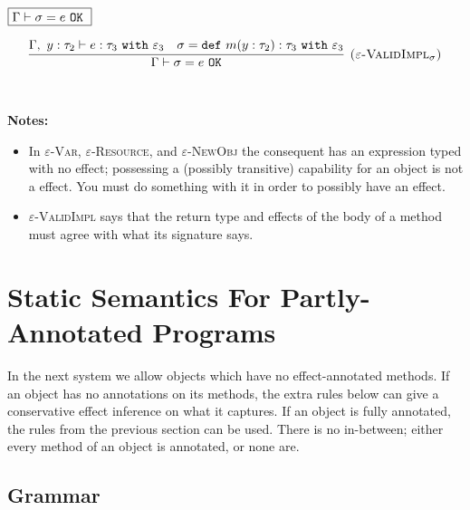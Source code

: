 \documentclass{llncs}
\newcommand{\keywadj}[1]{\mathtt{#1}}
\newcommand{\keyw}[1]{\keywadj{#1}~}
\begin{document}
$\fbox{$\Gamma \vdash \sigma = e~\keyw{OK}$}$

\[
\begin{array}{c}
\infer[\textsc{($\varepsilon$-ValidImpl$_\sigma$)}]
	{\Gamma \vdash \sigma = e~\keywadj{OK}}
	{\Gamma,~y:\tau_2 \vdash e: \tau_3~\keyw{with} \varepsilon_3 & \sigma = \keyw{def} m(y:\tau_2):\tau_3~\keyw{with} \varepsilon_3} \\[5ex]
\end{array}
\]

\noindent \textbf{Notes:}

\begin{itemize}
	\item In \textsc{$\varepsilon$-Var}, \textsc{$\varepsilon$-Resource}, and \textsc{$\varepsilon$-NewObj} the consequent has an expression typed with no effect; possessing a (possibly transitive) capability for an object is not a effect. You must do something with it in order to possibly have an effect.
	\item \textsc{$\varepsilon$-ValidImpl} says that the return type and effects of the body of a method must agree with what its signature says.
\end{itemize}




\newpage

\section{Static Semantics For Partly-Annotated Programs}

\noindent
In the next system we allow objects which have no effect-annotated methods. If an object has no annotations on its methods, the extra rules below can give a conservative effect inference on what it captures. If an object is fully annotated, the rules from the previous section can be used. There is no in-between; either every method of an object is annotated, or none are.

\subsection{Grammar}
\end{document}
